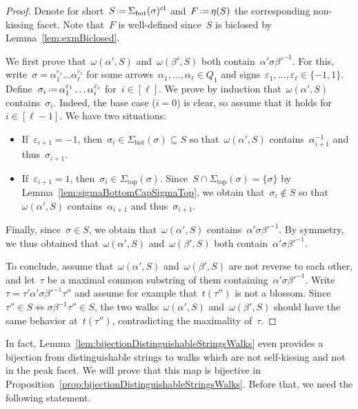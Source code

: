 \documentclass{amsart}
\theoremstyle{definition}
\newcommand{\eqdef}{\mbox{\,\raisebox{0.2ex}{\scriptsize\ensuremath{\mathrm:}}\ensuremath{=}\,}} %
\renewcommand{\top}{\mathrm{top}} %
\newcommand{\bottom}{\mathrm{bot}} %
\newcommand{\closure}[1]{#1^{\mathrm{cl}}} %
\begin{document}
\begin{proof}
Denote for short~$S \eqdef \closure{\Sigma_\bottom(\sigma)}$ and~$F \eqdef \eta(S)$ the corresponding non-kissing facet. Note that~$F$ is well-defined since~$S$ is biclosed by Lemma~\ref{lem:exmBiclosed}.

We first prove that~$\omega(\alpha',S)$ and~$\omega(\beta',S)$ both contain~$\alpha' \sigma \beta'^{-1}$.
For this, write~$\sigma = \alpha_1^{\varepsilon_1} \dots \alpha_\ell^{\varepsilon_\ell}$ for some arrows~$\alpha_1, \dots, \alpha_\ell \in Q_1$ and signs~$\varepsilon_1, \dots, \varepsilon_\ell \in \{-1, 1\}$.
Define~$\sigma_i \eqdef \alpha_1^{\varepsilon_1} \dots \alpha_i^{\varepsilon_i}$ for~$i \in [\ell]$.
We prove by induction that~$\omega(\alpha',S)$ contains~$\sigma_i$.
Indeed, the base case ($i = 0$) is clear, so assume that it holds for~$i \in [\ell-1]$.
We have two situations:
\begin{itemize}
\item If~$\varepsilon_{i+1} = -1$, then~$\sigma_i \in \Sigma_\bottom(\sigma) \subseteq S$ so that~$\omega(\alpha',S)$ contains~$\alpha_{i+1}^{-1}$ and thus~$\sigma_{i+1}$.
\item If~$\varepsilon_{i+1} = 1$, then~$\sigma_i \in \Sigma_\top(\sigma)$. Since~$S \cap \Sigma_\top(\sigma) = \{\sigma\}$ by Lemma~\ref{lem:sigmaBottomCapSigmaTop}, we obtain that~$\sigma_i \notin S$ so that~$\omega(\alpha',S)$ contains~$\alpha_{i+1}$ and thus~$\sigma_{i+1}$.
\end{itemize}
Finally, since~$\sigma \in S$, we obtain that~$\omega(\alpha',S)$ contains~$\alpha' \sigma \beta'^{-1}$.
By symmetry, we thus obtained that~$\omega(\alpha',S)$ and~$\omega(\beta',S)$ both contain~$\alpha' \sigma \beta'^{-1}$.

To conclude, assume that~$\omega(\alpha',S)$ and~$\omega(\beta',S)$ are not reverse to each other, and let~$\tau$ be a maximal common substring of them containing~$\alpha' \sigma \beta'^{-1}$.
Write~$\tau = \tau' \alpha' \sigma \beta'^{-1} \tau''$ and assume for example that~$t(\tau'')$ is not a blossom.
Since~$\tau'' \in S \iff \sigma \beta^{-1} \tau'' \in S$, the two walks~$\omega(\alpha',S)$ and~$\omega(\beta',S)$ should have the same behavior at~$t(\tau'')$, contradicting the maximality of~$\tau$.
\end{proof}

In fact, Lemma~\ref{lem:bijectionDistinguishableStringsWalks} even provides a bijection from distinguishable strings to walks which are not self-kissing and not in the peak facet.
We will prove that this map is bijective in Proposition~\ref{prop:bijectionDistinguishableStringsWalks}.
Before that, we need the following statement.
\end{document}
